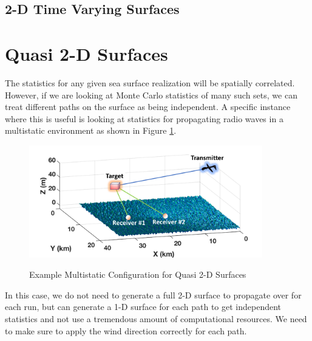 \subsection {2-D Time Varying Surfaces}

\section {Quasi 2-D Surfaces}
The statistics for any given sea surface realization will be spatially correlated. However, if we are looking at Monte Carlo statistics of many such sets, we can treat different paths on the surface as being independent. A specific instance where this is useful is looking at statistics for propagating radio waves in a multistatic environment as shown in Figure \ref{os_fig:16}. 

\begin{figure}[H]
  \begin{center}
\includegraphics[width=4in]{../media/multistatic/ms_rf_concept2.png}
  \end{center}
  \renewcommand{\baselinestretch}{1} \small\normalsize
  \begin{quote}
    \caption[Example Multistatic Configuration for Quasi 2-D Surfaces]{Example Multistatic Configuration for Quasi 2-D Surfaces\label{os_fig:16}}
  \end{quote}
\end{figure}
\renewcommand{\baselinestretch}{2} \small\normalsize

In this case, we do not need to generate a full 2-D surface to propagate over for each run, but can generate a 1-D surface for each path to get independent statistics and not use a tremendous amount of computational resources. We need to make sure to apply the wind direction correctly for each path.
